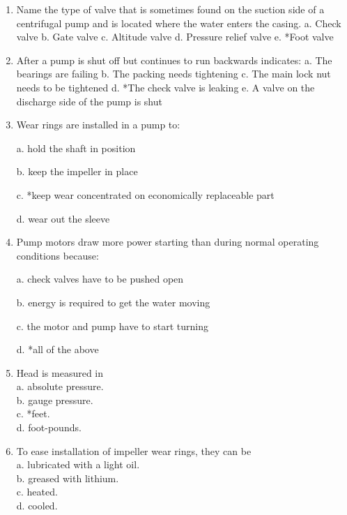 
\begin{enumerate}[1.]











\item Name the type of valve that is sometimes found on the suction side of a centrifugal pump and
is located where the water enters the casing.
a. Check valve
b. Gate valve
c. Altitude valve
d. Pressure relief valve
e. *Foot valve

\item After a pump is shut off but continues to run backwards indicates:
a. The bearings are failing
b. The packing needs tightening
c. The main lock nut needs to be tightened
d. *The check valve is leaking
e. A valve on the discharge side of the pump is shut

  \item Wear rings are installed in a pump to:

a. hold the shaft in position

b. keep the impeller in place

c. *keep wear concentrated on economically replaceable part

d. wear out the sleeve

\item Pump motors draw more power starting than during normal operating conditions because:


a. check valves have to be pushed open

b. energy is required to get the water moving

c. the motor and pump have to start turning

d. *all of the above

\item Head is measured in\\
a. absolute pressure.\\
b. gauge pressure.\\
c. *feet.\\
d. foot-pounds.

  \item To ease installation of impeller wear rings, they can be\\
a. lubricated with a light oil.\\
b. greased with lithium.\\
c. heated.\\
d. cooled.


\end{enumerate}
